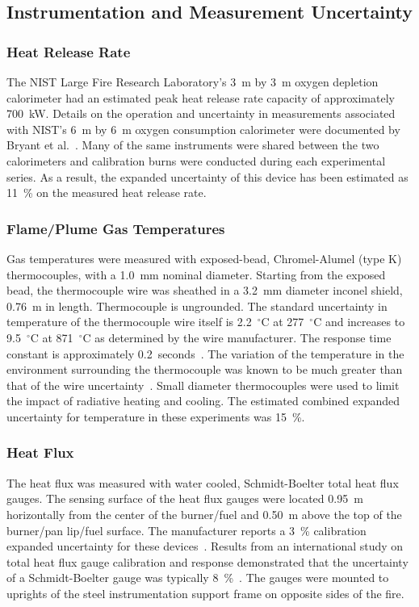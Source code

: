 \documentclass[twoside]{uocthesis}
\begin{document}
{\subsection{Instrumentation and Measurement Uncertainty}

\subsubsection{Heat Release Rate}

The NIST Large Fire Research Laboratory's 3~m by 3~m oxygen depletion calorimeter had an estimated peak heat release rate capacity of approximately 700~kW.  Details on the operation and uncertainty in measurements associated with NIST’s 6~m by 6~m oxygen consumption calorimeter were documented by Bryant et al.~\cite{Bryant:2004}. Many of the same instruments were shared between the two calorimeters and calibration burns were conducted during each experimental series.  As a result, the expanded uncertainty of this device has been estimated as 11~\% on the measured heat release rate.

\subsubsection{Flame/Plume Gas Temperatures}

Gas temperatures were measured with exposed-bead, Chromel-Alumel (type K) thermocouples, with a 1.0~mm nominal diameter.  Starting from the exposed bead, the thermocouple wire was sheathed in a 3.2~mm diameter inconel shield, 0.76~m in length. Thermocouple is ungrounded. The standard uncertainty in temperature of the thermocouple wire itself is 2.2~$^\circ$C at 277~$^\circ$C and increases to 9.5~$^\circ$C at 871~$^\circ$C as determined by the wire manufacturer.  The response time constant is approximately 0.2~seconds~\cite{Omega}.  The variation of the temperature in the environment surrounding the thermocouple was known to be much greater than that of the wire uncertainty~\cite{Blevins:1999,Pitts:2001}. Small diameter thermocouples were used to limit the impact of radiative heating and cooling.  The estimated combined expanded uncertainty for temperature in these experiments was 15~\%.

\subsubsection{Heat Flux}

The heat flux was measured with water cooled, Schmidt-Boelter total heat flux gauges. The sensing surface of the heat flux gauges were located 0.95~m horizontally from the center of the burner/fuel and 0.50~m above the top of the burner/pan lip/fuel surface.  The manufacturer reports a 3~\% calibration expanded uncertainty for these devices~\cite{Medtherm}. Results from an international study on total heat flux gauge calibration and response demonstrated that the uncertainty of a Schmidt-Boelter gauge was typically 8~\%~\cite{Pitts:2006}.  The gauges were mounted to uprights of the steel instrumentation support frame on opposite sides of the fire.

}
\end{document}
